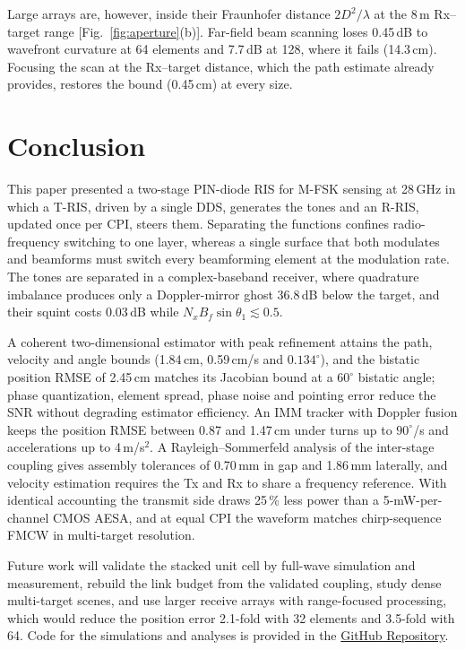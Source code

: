 \documentclass[journal]{IEEEtran}
\newcommand{\Tris}{T-RIS}
\newcommand{\Rris}{R-RIS}
\begin{document}
Large arrays are, however, inside their Fraunhofer distance $2D^2/\lambda$ at the 8\,m Rx--target range [Fig.~\ref{fig:aperture}(b)]. Far-field beam scanning loses 0.45\,dB to wavefront curvature at 64 elements and 7.7\,dB at 128, where it fails (14.3\,cm). Focusing the scan at the Rx--target distance, which the path estimate already provides, restores the bound (0.45\,cm) at every size.

\section{Conclusion}
\label{sec:conclusion}
This paper presented a two-stage PIN-diode RIS for M-FSK sensing at 28\,GHz in which a \Tris{}, driven by a single DDS, generates the tones and an \Rris{}, updated once per CPI, steers them. Separating the functions confines radio-frequency switching to one layer, whereas a single surface that both modulates and beamforms must switch every beamforming element at the modulation rate. The tones are separated in a complex-baseband receiver, where quadrature imbalance produces only a Doppler-mirror ghost 36.8\,dB below the target, and their squint costs 0.03\,dB while $N_xB_f\sin\theta_1 \lesssim 0.5$.

A coherent two-dimensional estimator with peak refinement attains the path, velocity and angle bounds (1.84\,cm, 0.59\,cm/s and $0.134^\circ$), and the bistatic position RMSE of 2.45\,cm matches its Jacobian bound at a $60^\circ$ bistatic angle; phase quantization, element spread, phase noise and pointing error reduce the SNR without degrading estimator efficiency. An IMM tracker with Doppler fusion keeps the position RMSE between 0.87 and 1.47\,cm under turns up to $90^\circ$/s and accelerations up to 4\,m/s$^2$. A Rayleigh--Sommerfeld analysis of the inter-stage coupling gives assembly tolerances of 0.70\,mm in gap and 1.86\,mm laterally, and velocity estimation requires the Tx and Rx to share a frequency reference. With identical accounting the transmit side draws 25\,\% less power than a 5-mW-per-channel CMOS AESA, and at equal CPI the waveform matches chirp-sequence FMCW in multi-target resolution.

Future work will validate the stacked unit cell by full-wave simulation and measurement, rebuild the link budget from the validated coupling, study dense multi-target scenes, and use larger receive arrays with range-focused processing, which would reduce the position error 2.1-fold with 32 elements and 3.5-fold with 64. Code for the simulations and analyses is provided in the \href{https://github.com/PavanMohanN/2S_RIS_MFSK}{GitHub Repository}.
\end{document}
